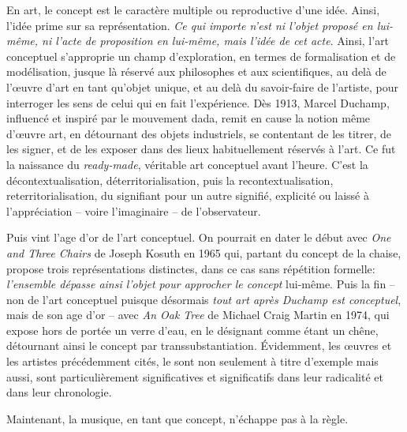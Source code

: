 \documentclass{article}
\begin{document}
En art, le concept est le caractère multiple ou reproductive d'une idée. Ainsi, l'idée prime sur sa représentation. \textit{Ce qui importe n’est ni l’objet proposé en lui-même, ni l’acte de proposition en lui-même, mais l’idée de cet acte}.
Ainsi, l'art conceptuel s'approprie un champ d'exploration, en termes de formalisation et de modélisation, jusque là réservé aux philosophes et aux scientifiques, au delà de l'œuvre d'art en tant qu'objet unique, et au delà du savoir-faire de l'artiste, pour interroger les sens de celui qui en fait l'expérience.
Dès 1913, Marcel Duchamp, influencé et inspiré par le mouvement dada, remit en cause la notion même d'œuvre art, en détournant des objets industriels, se contentant de les titrer, de les signer, et de les exposer dans des lieux habituellement réservés à l'art. Ce fut la naissance du \textit{ready-made}, véritable art conceptuel avant l'heure. C'est la décontextualisation, déterritorialisation, puis la recontextualisation, reterritorialisation, du signifiant pour un autre signifié, explicité ou laissé à l'appréciation -- voire l'imaginaire -- de l'observateur. 

Puis vint l'age d'or de l'art conceptuel. On pourrait en dater le début avec \textit{One and Three Chairs} de Joseph Kosuth en 1965 qui, partant du concept de la chaise, propose trois représentations distinctes, dans ce cas sans répétition formelle: \textit{l’ensemble dépasse ainsi l’objet pour approcher le concept} lui-même. 
Puis la fin -- non de l'art conceptuel puisque désormais \textit{tout art après Duchamp est conceptuel}, mais de son age d'or -- avec \textit{An Oak Tree} de Michael Craig Martin en 1974, qui expose hors de portée un verre d'eau, en le désignant comme étant un chêne, détournant ainsi le concept par transsubstantiation.  
Évidemment, les œuvres et les artistes précédemment cités, le sont non seulement à titre d'exemple mais aussi, sont particulièrement significatives et significatifs dans leur radicalité et dans leur chronologie.


Maintenant, la musique, en tant que concept, n'échappe pas à la règle. 

\bigskip

%    
  
\end{document}
